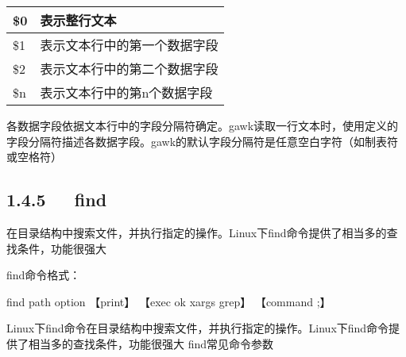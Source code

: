 \documentclass[letterpaper,12pt,english]{sphinxmanual}
\begin{document}
\begin{savenotes}\sphinxattablestart
\centering
\begin{tabulary}{\linewidth}[t]{|T|T|}
\hline
\sphinxstyletheadfamily 
\$0
&\sphinxstyletheadfamily 
表示整行文本
\\
\hline
\$1
&
表示文本行中的第一个数据字段
\\
\hline
\$2
&
表示文本行中的第二个数据字段
\\
\hline
\$n
&
表示文本行中的第n个数据字段
\\
\hline
\end{tabulary}
\par
\sphinxattableend\end{savenotes}

各数据字段依据文本行中的字段分隔符确定。gawk读取一行文本时，使用定义的字段分隔符描述各数据字段。gawk的默认字段分隔符是任意空白字符（如制表符或空格符）


\subsection{1.4.5   find}
\label{\detokenize{001software/001install/linux:id6}}

在目录结构中搜索文件，并执行指定的操作。Linux下find命令提供了相当多的查找条件，功能很强大

find命令格式：

\begin{sphinxVerbatim}[commandchars=\\\{\}]
find path \PYGZhy{}option 【\PYGZhy{}print】 【\PYGZhy{}exec \PYGZhy{}ok \textbar{}xargs \textbar{}grep】 【command \PYGZob{}\PYGZcb{} \PYGZbs{};】
\end{sphinxVerbatim}

Linux下find命令在目录结构中搜索文件，并执行指定的操作。Linux下find命令提供了相当多的查找条件，功能很强大
find常见命令参数
\end{document}
